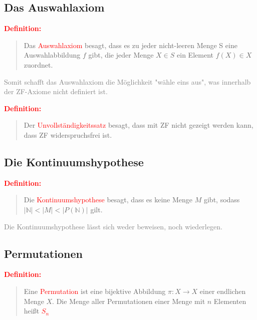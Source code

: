 \documentclass{article}
\newcommand{\red}[1]{\textcolor{red}{#1}}
\newcommand{\gray}[1]{\textcolor{gray}{#1}}
\newcommand{\de}[1]{\red{\textbf{Definition: }}\begin{quote}#1\end{quote}}
\newcommand{\N}{\mathbb{N}}
\begin{document}
\subsection{Das Auswahlaxiom}

\de{Das \red{Auswahlaxiom} besagt, dass es zu jeder nicht-leeren Menge S eine Auswahlabbildung $f$ gibt, die jeder Menge $X \in S$ ein Element $f(X) \in X$ zuordnet.}
\gray{Somit schafft das Auswahlaxiom die Möglichkeit "wähle eins aus", was innerhalb der ZF-Axiome nicht definiert ist.}

\de{Der \red{Unvollständigkeitssatz} besagt, dass mit ZF nicht gezeigt werden kann, dass ZF widerspruchsfrei ist.}

\subsection{Die Kontinuumshypothese}

\de{Die \red{Kontinuumshypothese} besagt, dass es keine Menge $M$ gibt, sodass $|\N| < |M| < |P(\N)|$ gilt.}
\gray{Die Kontinuumshypothese lässt sich weder beweisen, noch wiederlegen.}

\subsection{Permutationen}

\de{Eine \red{Permutation} ist eine bijektive Abbildung $\pi: X \to X$ einer endlichen Menge $X$. Die Menge aller Permutationen einer Menge mit $n$ Elementen heißt \red{$S_n$}}
\end{document}
